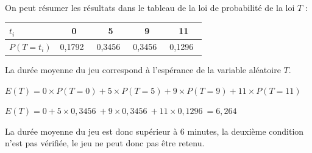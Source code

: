 \documentclass[10pt]{article}
\providecommand{\np}[2][]{{#2~#1}}
\begin{document}
On peut résumer les résultats dans le tableau de la loi de probabilité de la loi $T$ : 

\begin{center}
\begin{tabular}{|l|c|c|c|c|}\hline 
$t_i$ 		& 0 			& 5 			& 9 			& 11\\\hline
$P(T=t_i)$ 	& \np{0,1792} 	& \np{0,3456} 	& \np{0,3456} 	& \np{0,1296}\\\hline
\end{tabular}
\end{center}

La durée moyenne du jeu correspond à l'espérance de la variable aléatoire $T$.

$E(T)= 0 \times P(T=0) + 5 \times P(T=5) + 9 \times P(T=9) + 11 \times P(T=11)$

$E(T) = 0 + 5\times \np{0,3456}+ 9 \times \np{0,3456} + 11 \times \np{0,1296}= 6,264$

La durée moyenne du jeu est donc supérieur à  6 minutes, la deuxième condition n'est pas vérifiée, le jeu ne peut donc pas être retenu.
\end{document}
